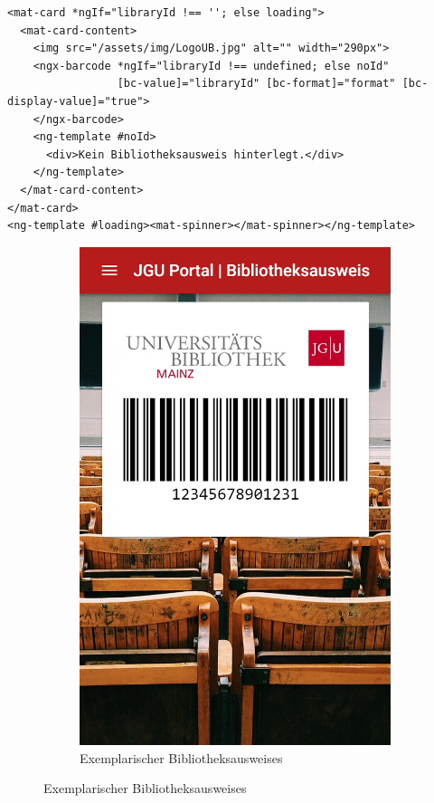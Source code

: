 \begin{lstlisting}[float, floatplacement=h, style=htmlcssjs, caption={Template für den Bibliotheksausweis}, label={BibId}]
<mat-card *ngIf="libraryId !== ''; else loading">
  <mat-card-content>
    <img src="/assets/img/LogoUB.jpg" alt="" width="290px">
    <ngx-barcode *ngIf="libraryId !== undefined; else noId"
                 [bc-value]="libraryId" [bc-format]="format" [bc-display-value]="true">
    </ngx-barcode>
    <ng-template #noId>
      <div>Kein Bibliotheksausweis hinterlegt.</div>
    </ng-template>
  </mat-card-content>
</mat-card>
<ng-template #loading><mat-spinner></mat-spinner></ng-template>

\end{lstlisting}
\begin{figure}
\begin{subfigure}{.5\textwidth}
  \centering
  \includegraphics[width=.8\linewidth]{gfx/BibID}
  \caption{Exemplarischer Bibliotheksausweises}
  \label{fig:BibId}
\end{subfigure}%

\end{figure}
